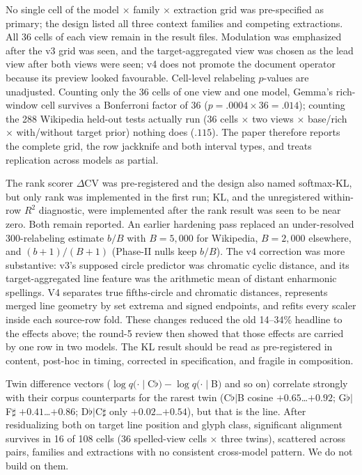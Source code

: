 \documentclass[11pt]{article}
\newcommand{\fl}{$\flat$}
\newcommand{\sh}{$\sharp$}
\begin{document}
\begin{auditbox}
No single cell of the model $\times$ family $\times$ extraction grid was pre-specified as primary; the design listed all three context families and competing extractions. All 36 cells of each view remain in the result files. Modulation was emphasized after the v3 grid was seen, and the target-aggregated view was chosen as the lead view after both views were seen; v4 does not promote the document operator because its preview looked favourable. Cell-level relabeling $p$-values are unadjusted. Counting only the 36 cells of one view and one model, Gemma's rich-window cell survives a Bonferroni factor of 36 ($p=.0004\times36=.014$); counting the 288 Wikipedia held-out tests actually run (36 cells $\times$ two views $\times$ base/rich $\times$ with/without target prior) nothing does ($.115$). The paper therefore reports the complete grid, the row jackknife and both interval types, and treats replication across models as partial.\par\smallskip

The rank scorer $\Delta$CV was pre-registered and the design also named softmax-KL, but only rank was implemented in the first run; KL, and the unregistered within-row $R^2$ diagnostic, were implemented after the rank result was seen to be near zero. Both remain reported. An earlier hardening pass replaced an under-resolved 300-relabeling estimate $b/B$ with $B=5{,}000$ for Wikipedia, $B=2{,}000$ elsewhere, and $(b+1)/(B+1)$ (Phase-II nulls keep $b/B$). The v4 correction was more substantive: v3's supposed circle predictor was chromatic cyclic distance, and its target-aggregated line feature was the arithmetic mean of distant enharmonic spellings. V4 separates true fifths-circle and chromatic distances, represents merged line geometry by set extrema and signed endpoints, and refits every scaler inside each source-row fold. These changes reduced the old 14--34\% headline to the effects above; the round-5 review then showed that those effects are carried by one row in two models. The KL result should be read as pre-registered in content, post-hoc in timing, corrected in specification, and fragile in composition.
\end{auditbox}

Twin difference vectors ($\log q(\cdot\mid$C\fl$)-\log q(\cdot\mid$B$)$ and so on) correlate strongly with their corpus counterparts for the rarest twin (C\fl$|$B cosine $+0.65$…$+0.92$; G\fl$|$F\sh{} $+0.41$…$+0.86$; D\fl$|$C\sh{} only $+0.02$…$+0.54$), but that is the line. After residualizing both on target line position and glyph class, significant alignment survives in 16 of 108 cells (36 spelled-view cells $\times$ three twins), scattered across pairs, families and extractions with no consistent cross-model pattern. We do not build on them.
\end{document}
